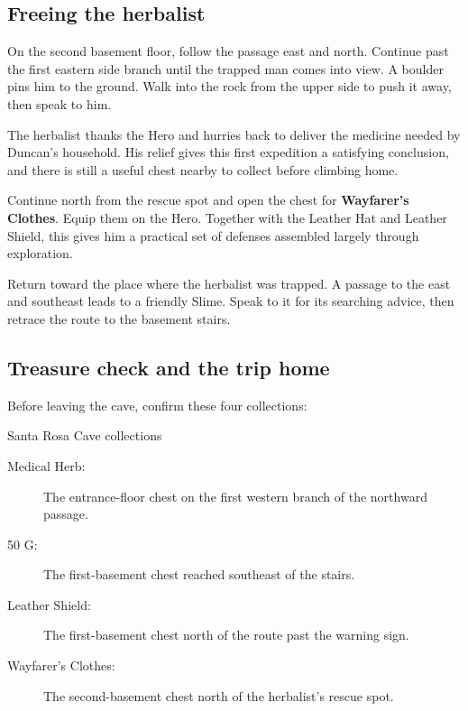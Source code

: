 \subsection*{Freeing the herbalist}

On the second basement floor, follow the passage east and north. Continue
past the first eastern side branch until the trapped man comes into view.
A boulder pins him to the ground. Walk into the rock from the upper side
to push it away, then speak to him.


The herbalist thanks the Hero and hurries back to deliver the medicine
needed by Duncan's household. His relief gives this first expedition a
satisfying conclusion, and there is still a useful chest nearby to collect
before climbing home.

Continue north from the rescue spot and open the chest for
\textbf{Wayfarer's Clothes}. Equip them on the Hero. Together with the
Leather Hat and Leather Shield, this gives him a practical set of defenses
assembled largely through exploration.

Return toward the place where the herbalist was trapped. A passage to
the east and southeast leads to a friendly Slime. Speak to it for its
searching advice, then retrace the route to the basement stairs.

\subsection*{Treasure check and the trip home}

Before leaving the cave, confirm these four collections:
\begin{routecheck}{Santa Rosa Cave collections}
\begin{description}
  \item[Medical Herb:] The entrance-floor chest on the first western
    branch of the northward passage.
  \item[50 G:] The first-basement chest reached southeast of the stairs.
  \item[Leather Shield:] The first-basement chest north of the route
    past the warning sign.
  \item[Wayfarer's Clothes:] The second-basement chest north of the
    herbalist's rescue spot.
\end{description}
\end{routecheck}

